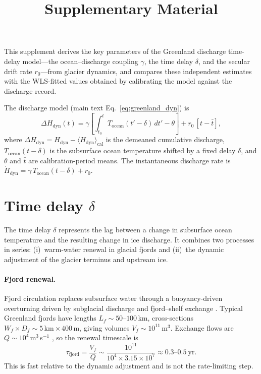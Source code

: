 \documentclass[11pt]{article}
\title{Supplementary Material}
\author{}
\date{}
\begin{document}
\maketitle

\noindent This supplement derives the key parameters of the Greenland discharge time-delay model---the ocean--discharge coupling $\gamma$, the time delay $\delta$, and the secular drift rate $r_0$---from glacier dynamics, and compares these independent estimates with the WLS-fitted values obtained by calibrating the model against the \citet{Mouginot2019} discharge record.

The discharge model (main text Eq.~\ref*{eq:greenland_dyn}) is
\begin{equation}
	\Delta H_{\mathrm{dyn}}(t) = \gamma \left[\int_{t_0}^{t} T_{\mathrm{ocean}}(t' - \delta)\, dt' - \theta\right] + r_0\, [t - \bar{t}],
	\label{eq:sup_Hdyn}
\end{equation}
where $\Delta H_{\mathrm{dyn}} = H_{\mathrm{dyn}} - \langle H_{\mathrm{dyn}} \rangle_{\mathrm{cal}}$ is the demeaned cumulative discharge, $T_{\mathrm{ocean}}(t - \delta)$ is the subsurface ocean temperature shifted by a fixed delay $\delta$, and $\theta$ and $\bar{t}$ are calibration-period means. The instantaneous discharge rate is $\dot{H}_{\mathrm{dyn}} = \gamma\, T_{\mathrm{ocean}}(t - \delta) + r_0$.

\section{Time delay $\delta$}
\label{sec:delta}

The time delay $\delta$ represents the lag between a change in subsurface ocean temperature and the resulting change in ice discharge. It combines two processes in series: (i)~warm-water renewal in glacial fjords and (ii)~the dynamic adjustment of the glacier terminus and upstream ice.

\paragraph{Fjord renewal.}
Fjord circulation replaces subsurface water through a buoyancy-driven overturning driven by subglacial discharge and fjord--shelf exchange \citep{Straneo2015}. Typical Greenland fjords have lengths $L_f \sim 50$--$100$\,km, cross-sections $W_f \times D_f \sim 5\,\mathrm{km} \times 400\,\mathrm{m}$, giving volumes $V_f \sim 10^{11}$\,m$^3$. Exchange flows are $Q \sim 10^4$\,m$^3$\,s$^{-1}$ \citep{Straneo2013}, so the renewal timescale is
\begin{equation}
	\tau_{\mathrm{fjord}} = \frac{V_f}{Q} \sim \frac{10^{11}}{10^4 \times 3.15 \times 10^7} \approx 0.3\text{--}0.5\ \mathrm{yr}.
	\label{eq:tau_fjord}
\end{equation}
This is fast relative to the dynamic adjustment and is not the rate-limiting step.
\end{document}
